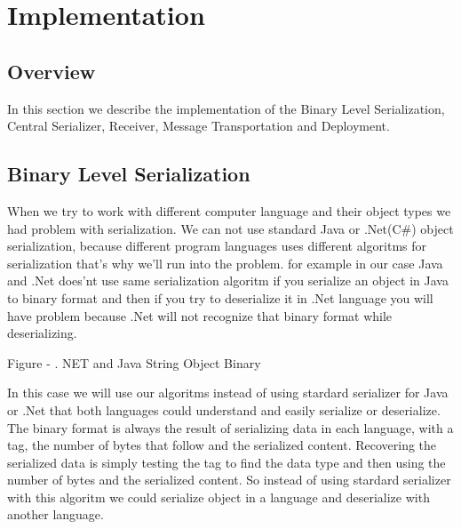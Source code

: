 

\chapter{Implementation}
\label{chapter:implementation}

\section{Overview}
\label{section:overview}

In this section we describe the implementation of the Binary Level Serialization, Central Serializer, Receiver,
 Message Transportation and Deployment.

\section{Binary Level Serialization}
\label{section:binaryLevelSerialization}
When we try to work with different computer language and their object types we had problem with serialization.
We can not use standard Java or .Net(C\#) object serialization, because different program languages uses different algoritms
for serialization that's why we’ll run into the problem. for example in our case Java and .Net does'nt use same serialization
algoritm if you serialize an object in Java to binary format and then if you try to deserialize it in .Net language you
will have problem because .Net will not recognize that binary format while deserializing.


Figure - . NET and Java String Object Binary

In this case we will use our algoritms instead of using stardard serializer for Java or .Net that both languages could
understand and easily serialize or deserialize.\\

The binary format is always the result of serializing data in each language, with a tag, the number of bytes that follow and
the serialized content. Recovering the serialized data is simply testing the tag to find the data type and then using the
number of bytes and the serialized content. So instead of using stardard serializer with this algoritm we could serialize object
in a language and deserialize with another language.\\

